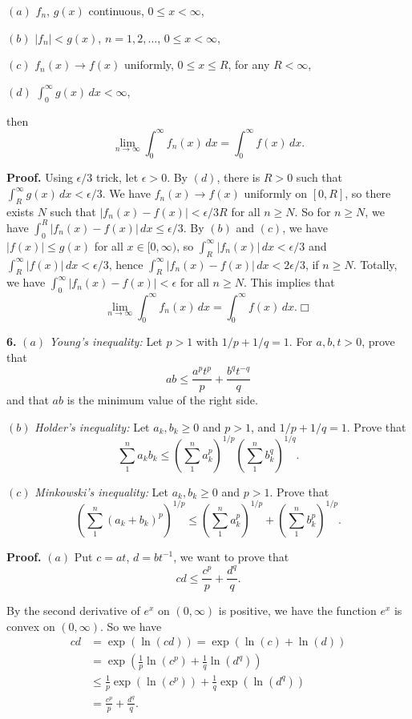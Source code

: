 \documentclass{article}
\begin{document}
$(a)$ $f_n$, $g(x)$ continuous, $0 \le x < \infty$,

$(b)$ $|f_n| < g(x)$, $n = 1,2,\ldots$, $0 \le x < \infty$,

$(c)$ $f_n(x) \to f(x)$ uniformly, $0 \le x \le R$, for any
$R < \infty$,

$(d)$ $\int_0^{\infty}g(x)\,dx < \infty$,

then
\[\lim_{n\to\infty}\int_0^{\infty}f_n(x)\,dx= \int_0^{\infty}f(x)\,dx.\]

\textbf{Proof.} Using $\epsilon/3$ trick, let $\epsilon > 0$. By $(d)$,
there is $R>0$ such that $\int_R^{\infty} g(x)\,dx < \epsilon/3$. We
have $f_n(x) \to f(x)$ uniformly on $[0,R]$, so there exists $N$ such
that $|f_n(x) - f(x)| < \epsilon/3R$ for all $n\ge N$. So for $n\ge N$,
we have $\int_0^R|f_n(x) - f(x)| \,dx \le \epsilon/3$. By $(b)$ and
$(c)$, we have $|f(x)| \le g(x)$ for all $x\in [0,\infty)$, so
$\int_R^{\infty}| f_n(x)|\,dx < \epsilon/3$ and
$\int_R^{\infty} |f(x)|\,dx < \epsilon/3$, hence
$\int_R^{\infty} | f_n(x) -f(x)|\,dx < 2\epsilon /3$, if $n \ge N$.
Totally, we have $\int_0^{\infty} |f_n(x) - f(x)| < \epsilon$ for all
$n\ge N$. This implies that
\[\lim_{n\to\infty}\int_0^{\infty}f_n(x)\,dx= \int_0^{\infty}f(x)\,dx.\Box\]

    \textbf{6.} $(a)$ \emph{Young's inequality:} Let $p>1$ with $1/p+1/q=1$.
For $a,b,t>0$, prove that \[ab\le \frac{a^pt^p}{p}+\frac{b^qt^{-q}}{q}\]
and that $ab$ is the minimum value of the right side.

$(b)$ \emph{Holder's inequality:} Let $a_k,b_k\ge 0$ and $p > 1$, and
$1/p + 1/q = 1$. Prove that
\[\sum_1^n a_kb_k\le \left(\sum_1^n a_k^p\right)^{1/p} \left(\sum_1^n b_k^q\right)^{1/q}.\]

$(c)$ \emph{Minkowski's inequality:} Let $a_k,b_k\ge 0$ and $p > 1$.
Prove that
\[\left(\sum_1^n (a_k+b_k)^p\right)^{1/p}\le \left(\sum_1^n a_k^p\right)^{1/p} + \left(\sum_1^n b_k^p\right)^{1/p}.\]

\textbf{Proof.} $(a)$ Put $c=at$, $d=bt^{-1}$, we want to prove that
\[ cd \le \frac{c^p}{p} + \frac{d^q}{q}.\]

By the second derivative of $e^x$ on $(0,\infty)$ is positive, we have
the function $e^x$ is convex on $(0,\infty)$. So we have
\[\begin{aligned}
cd &= \exp(\ln(cd)) = \exp(\ln(c) + \ln(d))\\
&= \exp\left(\frac{1}{p}\ln(c^p) + \frac{1}{q}\ln(d^q)\right) \\
& \le \frac{1}{p}\exp(\ln(c^p)) +\frac{1}{q}\exp(\ln(d^q)) \\
&= \frac{c^p}{p} + \frac{d^q}{q}.
\end{aligned}\]
\end{document}
